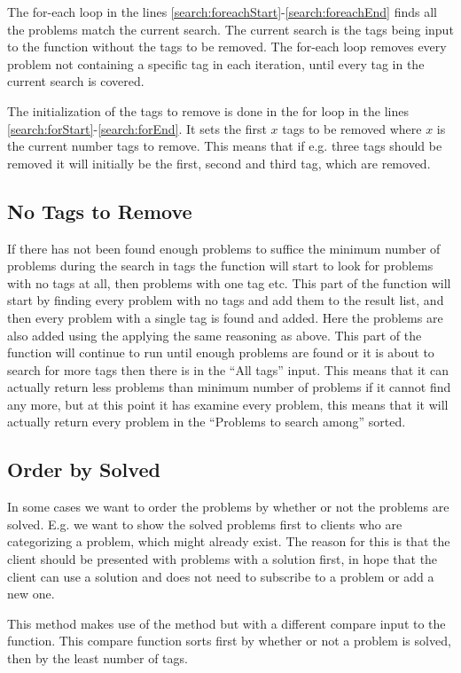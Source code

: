 The for-each loop in the lines \ref{search:foreachStart}-\ref{search:foreachEnd} finds all the problems match the current search.
The current search is the tags being input to the function without the tags to be removed.
The for-each loop removes every problem not containing a specific tag in each iteration, until every tag in the current search is covered.

The initialization of the tags to remove is done in the for loop in the lines \ref{search:forStart}-\ref{search:forEnd}.
It sets the first $x$ tags to be removed where $x$ is the current number tags to remove.
This means that if e.g. three tags should be removed it will initially be the first, second and third tag, which are removed.

\subsection{No Tags to Remove}
\label{sub:noTags}
If there has not been found enough problems to suffice the minimum number of problems during the search in tags the function will start to look for problems with no tags at all, then problems with one tag etc.
This part of the function will start by finding every problem with no tags and add them to the result list, and then every problem with a single tag is found and added.
Here the problems are also added using the  applying the same reasoning as above.
This part of the function will continue to run until enough problems are found or it is about to search for more tags then there is in the ``All tags'' input.
This means that it can actually return less problems than minimum number of problems if it cannot find any more, but at this point it has examine every problem, this means that it will actually return every problem in the ``Problems to search among'' sorted.

\subsection{Order by Solved}
\label{sub:orderSolved}
In some cases we want to order the problems by whether or not the problems are solved.
E.g. we want to show the solved problems first to clients who are categorizing a problem, which might already exist.
The reason for this is that the client should be presented with problems with a solution first, in hope that the client can use a solution and does not need to subscribe to a problem or add a new one.

This  method makes use of the  method but with a different compare input to the  function.
This compare function sorts first by whether or not a problem is solved, then by the least number of tags.